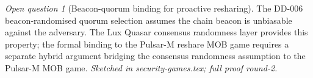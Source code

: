\documentclass[11pt,a4paper]{article}
\theoremstyle{definition}
\theoremstyle{remark}
\newtheorem{openq}{Open question}
\begin{document}
\begin{openq}[Beacon-quorum binding for proactive resharing]
The DD-006 beacon-randomised quorum selection assumes the chain
beacon is unbiasable against the adversary. The Lux Quasar
consensus randomness layer provides this property; the formal
binding to the Pulsar-M reshare MOB game requires a separate
hybrid argument bridging the consensus randomness assumption to
the Pulsar-M MOB game. \emph{Sketched in security-games.tex; full
proof round-2.}
\end{openq}



\end{document}
